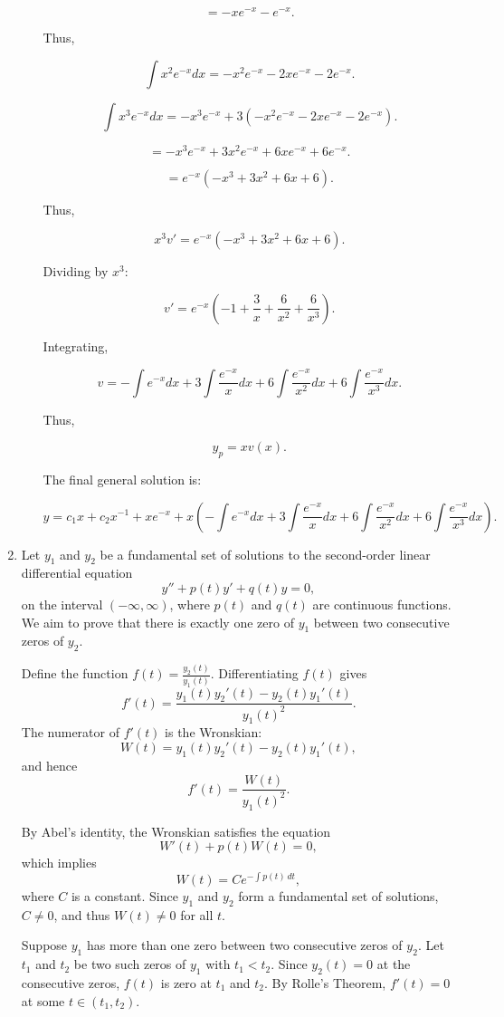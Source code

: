 \documentclass[12pt]{article}
\begin{document}
\begin{enumerate}
\begin{enumerate}
\[
= -x e^{-x} - e^{-x}.
\]

Thus,

\[
\int x^2 e^{-x} dx = -x^2 e^{-x} - 2x e^{-x} - 2e^{-x}.
\]

\[
\int x^3 e^{-x} dx = -x^3 e^{-x} + 3(-x^2 e^{-x} - 2x e^{-x} - 2e^{-x}).
\]

\[
= -x^3 e^{-x} + 3x^2 e^{-x} + 6x e^{-x} + 6e^{-x}.
\]

\[
= e^{-x} (-x^3 + 3x^2 + 6x + 6).
\]

Thus,

\[
x^3 v' = e^{-x} (-x^3 + 3x^2 + 6x + 6).
\]

Dividing by \( x^3 \):

\[
v' = e^{-x} \left(-1 + \frac{3}{x} + \frac{6}{x^2} + \frac{6}{x^3} \right).
\]

Integrating,

\[
v = -\int e^{-x} dx + 3 \int \frac{e^{-x}}{x} dx + 6 \int \frac{e^{-x}}{x^2} dx + 6 \int \frac{e^{-x}}{x^3} dx.
\]

Thus,

\[
y_p = x v(x).
\]

The final general solution is:

\[
y = c_1 x + c_2 x^{-1} + x e^{-x} + x \left( -\int e^{-x} dx + 3 \int \frac{e^{-x}}{x} dx + 6 \int \frac{e^{-x}}{x^2} dx + 6 \int \frac{e^{-x}}{x^3} dx \right).
\]
\end{enumerate}
\item 
Let \( y_1 \) and \( y_2 \) be a fundamental set of solutions to the second-order linear differential equation 
\[
y'' + p(t)y' + q(t)y = 0,
\]
on the interval \((- \infty, \infty)\), where \( p(t) \) and \( q(t) \) are continuous functions. We aim to prove that there is exactly one zero of \( y_1 \) between two consecutive zeros of \( y_2 \).

Define the function \( f(t) = \frac{y_2(t)}{y_1(t)} \). Differentiating \( f(t) \) gives
\[
f'(t) = \frac{y_1(t)y_2'(t) - y_2(t)y_1'(t)}{y_1(t)^2}.
\]
The numerator of \( f'(t) \) is the Wronskian:
\[
W(t) = y_1(t)y_2'(t) - y_2(t)y_1'(t),
\]
and hence
\[
f'(t) = \frac{W(t)}{y_1(t)^2}.
\]

By Abel's identity, the Wronskian satisfies the equation
\[
W'(t) + p(t)W(t) = 0,
\]
which implies
\[
W(t) = Ce^{-\int p(t) \, dt},
\]
where \( C \) is a constant. Since \( y_1 \) and \( y_2 \) form a fundamental set of solutions, \( C \neq 0 \), and thus \( W(t) \neq 0 \) for all \( t \).

Suppose \( y_1 \) has more than one zero between two consecutive zeros of \( y_2 \). Let \( t_1 \) and \( t_2 \) be two such zeros of \( y_1 \) with \( t_1 < t_2 \). Since \( y_2(t) = 0 \) at the consecutive zeros, \( f(t) \) is zero at \( t_1 \) and \( t_2 \). By Rolle's Theorem, \( f'(t)=0 \) at some \( t \in (t_1, t_2) \).


\end{enumerate}
\end{document}
